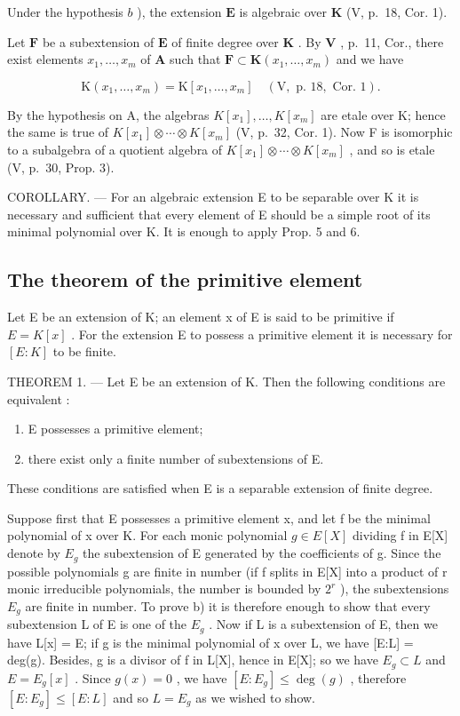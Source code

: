 Under the hypothesis \(b\) ), the extension \(\mathbf{E}\) is algebraic over \(\mathbf{K}\) (V, p.~18, Cor. 1).

Let \(\mathbf{F}\) be a subextension of \(\mathbf{E}\) of finite degree over \(\mathbf{K}\) . By \(\mathbf{V}\) , p.~11, Cor., there exist elements \(x_{1},\ldots ,x_{m}\) of \(\mathbf{A}\) such that \(\mathbf{F}\subset \mathbf{K}(x_1,\dots,x_m)\) and we have

\[
\mathrm{K} \left(x _ {1}, \dots , x _ {m}\right) = \mathrm{K} \left[ x _ {1}, \dots , x _ {m} \right] \quad (\mathrm{V}, \text { p. } 1 8, \text { Cor. } 1).
\]

By the hypothesis on A, the algebras \(K[x_{1}], \ldots, K[x_{m}]\) are etale over K; hence the same is true of \(K[x_{1}] \otimes \cdots \otimes K[x_{m}]\) (V, p.~32, Cor. 1). Now F is isomorphic to a subalgebra of a quotient algebra of \(K[x_{1}] \otimes \cdots \otimes K[x_{m}]\) , and so is etale (V, p.~30, Prop. 3).

COROLLARY. --- For an algebraic extension E to be separable over K it is necessary and sufficient that every element of E should be a simple root of its minimal polynomial over K. It is enough to apply Prop. 5 and 6.

\subsection{The theorem of the primitive element}

Let E be an extension of K; an element x of E is said to be primitive if \(E = K[x]\) . For the extension E to possess a primitive element it is necessary for \([E : K]\) to be finite.

THEOREM 1. --- Let E be an extension of K. Then the following conditions are equivalent :

\begin{enumerate}
\def\labelenumi{\alph{enumi})}
\item
  E possesses a primitive element;
\item
  there exist only a finite number of subextensions of E.
\end{enumerate}

These conditions are satisfied when E is a separable extension of finite degree.

Suppose first that E possesses a primitive element x, and let f be the minimal polynomial of x over K. For each monic polynomial \(g \in E[X]\) dividing f in E{[}X{]} denote by \(E_g\) the subextension of E generated by the coefficients of g. Since the possible polynomials g are finite in number (if f splits in E{[}X{]} into a product of r monic irreducible polynomials, the number is bounded by \(2^{r}\) ), the subextensions \(E_g\) are finite in number. To prove b) it is therefore enough to show that every subextension L of E is one of the \(E_g\) . Now if L is a subextension of E, then we have L{[}x{]} = E; if g is the minimal polynomial of x over L, we have {[}E:L{]} = deg(g). Besides, g is a divisor of f in L{[}X{]}, hence in E{[}X{]}; so we have \(E_g \subset L\) and \(E = E_g[x]\) . Since \(g(x) = 0\) , we have \([E : E_g] \leq \deg(g)\) , therefore \([E : E_g] \leq [E : L]\) and so \(L = E_g\) as we wished to show.

